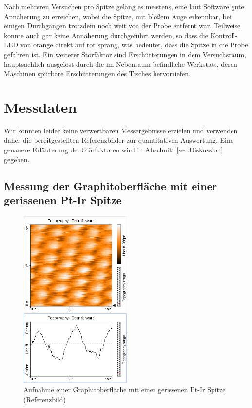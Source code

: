\documentclass[10pt, a4paper]{article}
\begin{document}
Nach mehreren Versuchen pro Spitze gelang es meistens, eine laut Software gute Annäherung zu erreichen, wobei die Spitze, mit bloßem Auge erkennbar, bei einigen Durchgängen trotzdem noch weit von der Probe entfernt war.
Teilweise konnte auch gar keine Annäherung durchgeführt werden, so dass die Kontroll-LED von orange direkt auf rot sprang, was bedeutet, dass die Spitze in die Probe gefahren ist.
Ein weiterer Störfaktor sind Erschütterungen in dem Versuchsraum, hauptsächlich ausgelöst durch die im Nebenraum befindliche Werkstatt, deren Maschinen spürbare Erschütterungen des Tisches hervorriefen.

\section{Messdaten}
Wir konnten leider keine verwertbaren Messergebnisse erzielen und verwenden daher die bereitgestellten Referenzbilder zur quantitativen Auswertung.
Eine genauere Erläuterung der Störfaktoren wird in Abschnitt \ref{sec:Diskussion} gegeben.

\subsection{Messung der Graphitoberfläche mit einer gerissenen Pt-Ir Spitze}
\begin{figure}[!h]
\centering
\includegraphics[width=0.5\textwidth]{./grafiken/originale/ref_graphit_pt_ir_1nm.png}
\caption{Aufnahme einer Graphitoberfläche mit einer gerissenen Pt-Ir Spitze (Referenzbild)}
\label{fig:ref_ptir}
\end{figure}
\end{document}
